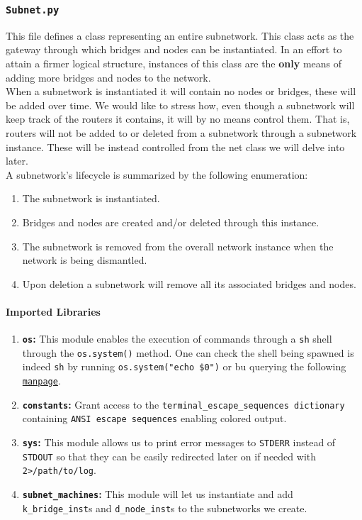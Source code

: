 \subsubsection{\texttt{Subnet.py}}
    This file defines a class representing an entire subnetwork. This class acts as the gateway through which bridges and nodes can be instantiated. In an effort to attain a firmer logical structure, instances of this class are the \textbf{only} means of adding more bridges and nodes to the network.\\

    When a subnetwork is instantiated it will contain no nodes or bridges, these will be added over time. We would like to stress how, even though a subnetwork will keep track of the routers it contains, it will by no means control them. That is, routers will not be added to or deleted from a subnetwork through a subnetwork instance. These will be instead controlled from the net class we will delve into later.\\

    A subnetwork's lifecycle is summarized by the following enumeration:\\

    \begin{enumerate}
        \item The subnetwork is instantiated.
        \item Bridges and nodes are created and/or deleted through this instance.
        \item The subnetwork is removed from the overall network instance when the network is being dismantled.
        \item Upon deletion a subnetwork will remove all its associated bridges and nodes.
    \end{enumerate}

    \paragraph{Imported Libraries}
        \begin{enumerate}
            \item \textbf{\texttt{os}:} This module enables the execution of commands through a \texttt{sh} shell through the \texttt{os.system()} method. One can check the shell being spawned is indeed \texttt{sh} by running \texttt{\allowbreak os.system("echo \$0")} or bu querying the following \href{https://linux.die.net/man/3/system}{\texttt{manpage}}.
            \item \textbf{\texttt{constants}:} Grant access to the \texttt{\allowbreak terminal\_escape\_sequences dictionary} containing \texttt{ANSI escape sequences} enabling colored output.
            \item \textbf{\texttt{sys}:} This module allows us to print error messages to \texttt{STDERR} instead of \texttt{STDOUT} so that they can be easily redirected later on if needed with \texttt{2>/path/to/log}.
            \item \textbf{\texttt{subnet\_machines}:} This module will let us instantiate and add \texttt{k\_bridge\_inst}s and \texttt{d\_node\_inst}s to the subnetworks we create.
        \end{enumerate}

